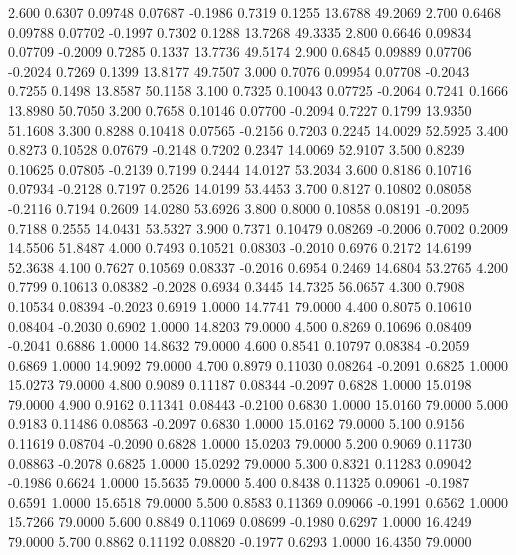    2.600   0.6307   0.09748   0.07687  -0.1986   0.7319   0.1255  13.6788  49.2069
   2.700   0.6468   0.09788   0.07702  -0.1997   0.7302   0.1288  13.7268  49.3335
   2.800   0.6646   0.09834   0.07709  -0.2009   0.7285   0.1337  13.7736  49.5174
   2.900   0.6845   0.09889   0.07706  -0.2024   0.7269   0.1399  13.8177  49.7507
   3.000   0.7076   0.09954   0.07708  -0.2043   0.7255   0.1498  13.8587  50.1158
   3.100   0.7325   0.10043   0.07725  -0.2064   0.7241   0.1666  13.8980  50.7050
   3.200   0.7658   0.10146   0.07700  -0.2094   0.7227   0.1799  13.9350  51.1608
   3.300   0.8288   0.10418   0.07565  -0.2156   0.7203   0.2245  14.0029  52.5925
   3.400   0.8273   0.10528   0.07679  -0.2148   0.7202   0.2347  14.0069  52.9107
   3.500   0.8239   0.10625   0.07805  -0.2139   0.7199   0.2444  14.0127  53.2034
   3.600   0.8186   0.10716   0.07934  -0.2128   0.7197   0.2526  14.0199  53.4453
   3.700   0.8127   0.10802   0.08058  -0.2116   0.7194   0.2609  14.0280  53.6926
   3.800   0.8000   0.10858   0.08191  -0.2095   0.7188   0.2555  14.0431  53.5327
   3.900   0.7371   0.10479   0.08269  -0.2006   0.7002   0.2009  14.5506  51.8487
   4.000   0.7493   0.10521   0.08303  -0.2010   0.6976   0.2172  14.6199  52.3638
   4.100   0.7627   0.10569   0.08337  -0.2016   0.6954   0.2469  14.6804  53.2765
   4.200   0.7799   0.10613   0.08382  -0.2028   0.6934   0.3445  14.7325  56.0657
   4.300   0.7908   0.10534   0.08394  -0.2023   0.6919   1.0000  14.7741  79.0000
   4.400   0.8075   0.10610   0.08404  -0.2030   0.6902   1.0000  14.8203  79.0000
   4.500   0.8269   0.10696   0.08409  -0.2041   0.6886   1.0000  14.8632  79.0000
   4.600   0.8541   0.10797   0.08384  -0.2059   0.6869   1.0000  14.9092  79.0000
   4.700   0.8979   0.11030   0.08264  -0.2091   0.6825   1.0000  15.0273  79.0000
   4.800   0.9089   0.11187   0.08344  -0.2097   0.6828   1.0000  15.0198  79.0000
   4.900   0.9162   0.11341   0.08443  -0.2100   0.6830   1.0000  15.0160  79.0000
   5.000   0.9183   0.11486   0.08563  -0.2097   0.6830   1.0000  15.0162  79.0000
   5.100   0.9156   0.11619   0.08704  -0.2090   0.6828   1.0000  15.0203  79.0000
   5.200   0.9069   0.11730   0.08863  -0.2078   0.6825   1.0000  15.0292  79.0000
   5.300   0.8321   0.11283   0.09042  -0.1986   0.6624   1.0000  15.5635  79.0000
   5.400   0.8438   0.11325   0.09061  -0.1987   0.6591   1.0000  15.6518  79.0000
   5.500   0.8583   0.11369   0.09066  -0.1991   0.6562   1.0000  15.7266  79.0000
   5.600   0.8849   0.11069   0.08699  -0.1980   0.6297   1.0000  16.4249  79.0000
   5.700   0.8862   0.11192   0.08820  -0.1977   0.6293   1.0000  16.4350  79.0000
